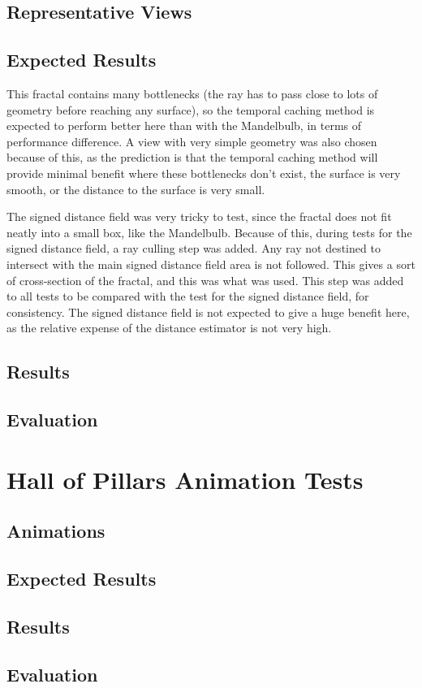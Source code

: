 \subsection{Representative Views}

\subsection{Expected Results}

This fractal contains many bottlenecks (the ray has to pass close to lots of geometry before reaching any surface), so the temporal caching method is expected to perform better here than with the Mandelbulb, in terms of performance difference. A view with very simple geometry was also chosen because of this, as the prediction is that the temporal caching method will provide minimal benefit where these bottlenecks don't exist, the surface is very smooth, or the distance to the surface is very small.\newline

The signed distance field was very tricky to test, since the fractal does not fit neatly into a small box, like the Mandelbulb. Because of this, during tests for the signed distance field, a ray culling step was added. Any ray not destined to intersect with the main signed distance field area is not followed. This gives a sort of cross-section of the fractal, and this was what was used. This step was added to all tests to be compared with the test for the signed distance field, for consistency. The signed distance field is not expected to give a huge benefit here, as the relative expense of the distance estimator is not very high.

\subsection{Results}

\subsection{Evaluation}

\section{Hall of Pillars Animation Tests}

\subsection{Animations}

\subsection{Expected Results}

\subsection{Results}

\subsection{Evaluation}